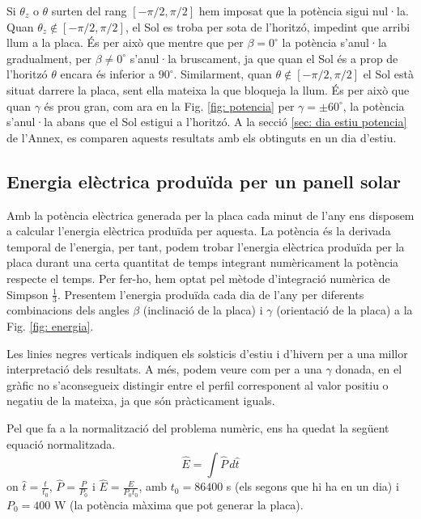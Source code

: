 \documentclass[11pt]{article}
\begin{document}
Si $\theta_z$ o $\theta$ surten del rang $[-\pi/2,\pi/2]$ hem imposat que la potència sigui nul·la. Quan $\theta_z \notin [-\pi/2,\pi/2]$, el Sol es troba per sota de l'horitzó, impedint que arribi llum a la placa. És per això que mentre que per $\beta = 0^{\circ}$ la potència s'anul·la gradualment, per $\beta \neq 0^{\circ}$ s'anul·la bruscament, ja que quan el Sol és a prop de l’horitzó $\theta$ encara és inferior a $90^{\circ}$. Similarment, quan $\theta \notin [-\pi/2,\pi/2]$ el Sol està situat darrere la placa, sent ella mateixa la que bloqueja la llum. És per això que quan $\gamma$ és prou gran, com ara en la Fig. \ref{fig: potencia} per $\gamma=\pm60^{\circ}$, la potència s'anul·la abans que el Sol estigui a l'horitzó. A la secció \ref{sec: dia estiu potencia} de l'Annex, es comparen aquests resultats amb els obtinguts en un dia d'estiu.

\subsection{Energia elèctrica produïda per un panell solar}
Amb la potència elèctrica generada per la placa cada minut de l'any ens disposem a calcular l'energia elèctrica produïda per aquesta. La potència és la derivada temporal de l'energia, per tant, podem trobar l'energia elèctrica produïda per la placa durant una certa quantitat de temps integrant numèricament la potència respecte el temps. Per fer-ho, hem optat pel mètode d'integració numèrica de Simpson $\frac{1}{3}$. Presentem l'energia produïda cada dia de l'any per diferents combinacions dels angles $\beta$ (inclinació de la placa) i $\gamma$ (orientació de la placa) a la Fig. \ref{fig: energia}.



Les linies negres verticals indiquen els solsticis d'estiu i d'hivern per a una millor interpretació dels resultats. A més, podem veure com per a una $\gamma$ donada, en el gràfic no s'aconsegueix distingir entre el perfil corresponent al valor positiu o negatiu de la mateixa, ja que són pràcticament iguals.

Pel que fa a la normalització del problema numèric, ens ha quedat la següent equació normalitzada.
\begin{equation}
    \hat{E} = \int \hat{P} \, d\hat{t}
    \label{energia}
\end{equation}
on $\hat{t}=\frac{t}{t_0}$, $\hat{P}=\frac{P}{P_0}$ i $\hat{E}=\frac{E}{P_0 t_0}$, amb $t_0=86400$ s (els segons que hi ha en un dia) i $P_0=400$ W (la potència màxima que pot generar la placa). 
\end{document}
